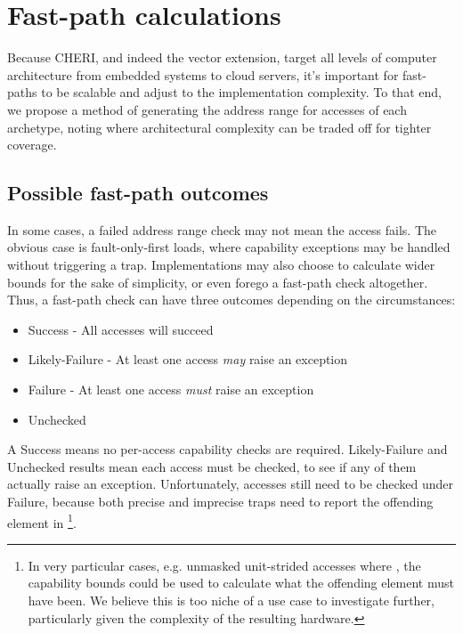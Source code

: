 \section{Fast-path calculations\label{chap:hardware:sec:fastpath}}
Because CHERI, and indeed the vector extension, target all levels of computer architecture from embedded systems to cloud servers, it's important for fast-paths to be scalable and adjust to the implementation complexity.
To that end, we propose a method of generating the address range for accesses of each archetype, noting where architectural complexity can be traded off for tighter coverage.


\subsection{Possible fast-path outcomes}
In some cases, a failed address range check may not mean the access fails.
The obvious case is fault-only-first loads, where capability exceptions may be handled without triggering a trap.
Implementations may also choose to calculate wider bounds for the sake of simplicity, or even forego a fast-path check altogether.
Thus, a fast-path check can have three outcomes depending on the circumstances:
\begin{itemize}
    \item Success - All accesses will succeed
    \item Likely-Failure - At least one access \emph{may} raise an exception
    \item Failure - At least one access \emph{must} raise an exception
    \item Unchecked
\end{itemize}


A Success means no per-access capability checks are required.
Likely-Failure and Unchecked results mean each access must be checked, to see if any of them actually raise an exception.
Unfortunately, accesses still need to be checked under Failure, because both precise and imprecise traps need to report the offending element in \footnote{In very particular cases, e.g. unmasked unit-strided accesses where , the capability bounds could be used to calculate what the offending element must have been. We believe this is too niche of a use case to investigate further, particularly given the complexity of the resulting hardware.}.

